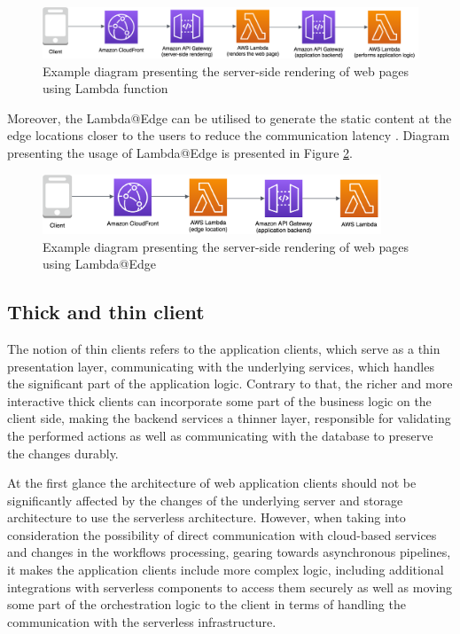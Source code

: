 \begin{figure}[H]
   \centering
   \includegraphics[width=1\textwidth]{assets/04-serverless-for-web-apps/serverSideRendering.png}
   \caption{Example diagram presenting the server-side rendering of web pages using Lambda function}
   \label{fig:pattern-client-server-side-rendering}
\end{figure}

Moreover, the Lambda@Edge can be utilised to generate the static content at the edge locations closer to the users to reduce the communication latency \cite{BuildingServerSideRenderingForReactInAwsLambda}.
Diagram presenting the usage of Lambda@Edge is presented in Figure \ref{fig:pattern-client-server-side-rendering-edge}.

\begin{figure}[H]
   \centering
   \includegraphics[width=0.9\textwidth]{assets/04-serverless-for-web-apps/serverSideRenderingEdge.png}
   \caption{Example diagram presenting the server-side rendering of web pages using Lambda@Edge}
   \label{fig:pattern-client-server-side-rendering-edge}
\end{figure}

\subsection{Thick and thin client}

The notion of thin clients refers to the application clients, which serve as a thin presentation layer, communicating with the underlying services, which handles the significant part of the application logic.
Contrary to that, the richer and more interactive thick clients can incorporate some part of the business logic on the client side, making the backend services a thinner layer, responsible for validating the performed actions as well as communicating with the database to preserve the changes durably.

At the first glance the architecture of web application clients should not be significantly affected by the changes of the underlying server and storage architecture to use the serverless architecture.
However, when taking into consideration the possibility of direct communication with cloud-based services and changes in the workflows processing, gearing towards asynchronous pipelines, it makes the application clients include more complex logic, including additional integrations with serverless components to access them securely as well as moving some part of the orchestration logic to the client in terms of handling the communication with the serverless infrastructure.


